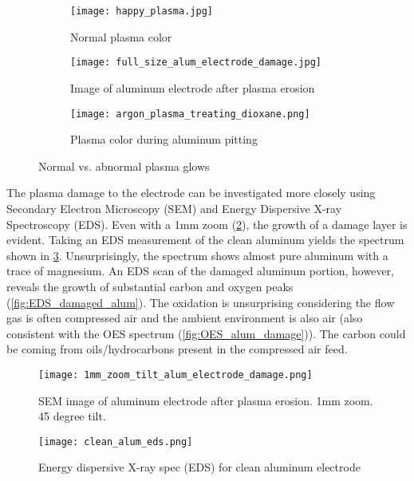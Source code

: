 \begin{figure}[htbp]
  \centering
  \begin{subfigure}{.3\textwidth}
    \centering
    \texttt{[image: happy\_plasma.jpg]}
    \caption{Normal plasma color}
  \end{subfigure}
  \begin{subfigure}{.3\textwidth}
    \centering
    \texttt{[image: full\_size\_alum\_electrode\_damage.jpg]}
    \caption{Image of aluminum electrode after plasma erosion}
  \end{subfigure}
  \begin{subfigure}{.3\textwidth}
    \centering
    \texttt{[image: argon\_plasma\_treating\_dioxane.png]}
    \caption{Plasma color during aluminum pitting}
  \end{subfigure}
  \caption{Normal vs. abnormal plasma glows}
  \label{fig:alum_damage_full}
\end{figure}

The plasma damage to the electrode can be investigated more closely using Secondary Electron Microscopy (SEM) and Energy Dispersive X-ray Spectroscopy (EDS). Even with a 1mm zoom (\cref{fig:alum_damage_1mm}), the growth of a damage layer is evident. Taking an EDS measurement of the clean aluminum yields the spectrum shown in \cref{fig:EDS_clean_alum}. Unsurprisingly, the spectrum shows almost pure aluminum with a trace of magnesium. An EDS scan of the damaged aluminum portion, however, reveals the growth of substantial carbon and oxygen peaks (\cref{fig:EDS_damaged_alum}). The oxidation is unsurprising considering the flow gas is often compressed air and the ambient environment is also air (also consistent with the OES spectrum (\cref{fig:OES_alum_damage})). The carbon could be coming from oils/hydrocarbons present in the compressed air feed.

\begin{figure}[htbp]
  \centering
  \texttt{[image: 1mm\_zoom\_tilt\_alum\_electrode\_damage.png]}
  \caption{SEM image of aluminum electrode after plasma erosion. 1mm zoom. 45 degree tilt.}
  \label{fig:alum_damage_1mm}
\end{figure}

\begin{figure}[htbp]
  \centering
  \texttt{[image: clean\_alum\_eds.png]}
  \caption{Energy dispersive X-ray spec (EDS) for clean aluminum electrode}
  \label{fig:EDS_clean_alum}
\end{figure}

